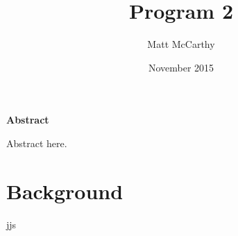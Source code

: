 \documentclass[notitlepage]{article}
\title{Program 2}
\date{November 2015}
\author{Matt McCarthy}
\begin{document}
\maketitle

\noindent\textbf{Abstract}

\noindent Abstract here.

\section{Background}
jjs
\end{document}
